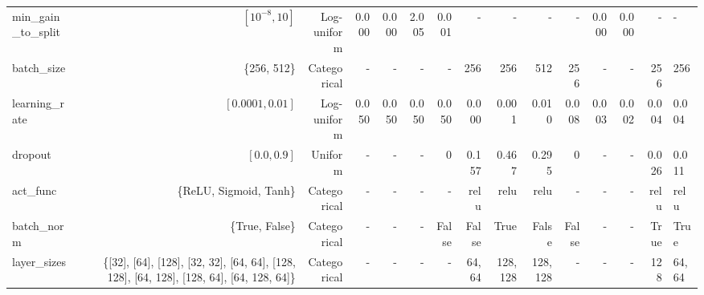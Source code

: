 \begin{tabular}{lrrrrrrrrrrrrr}
min_gain_to_split & $[10^{-8}, 10]$ & Log-uniform & 0.000 & 0.000 & 2.005 & 0.001 & - & - & - & - & 0.000 & 0.000 & - & - \\
batch_size & \{256, 512\} & Categorical & - & - & - & - & 256 & 256 & 512 & 256 & - & - & 256 & 256 \\
learning_rate & $[0.0001, 0.01]$ & Log-uniform & 0.050 & 0.050 & 0.050 & 0.050 & 0.000 & 0.001 & 0.010 & 0.008 & 0.003 & 0.002 & 0.004 & 0.004 \\
dropout & $[0.0, 0.9]$ & Uniform & - & - & - & 0 & 0.157 & 0.467 & 0.295 & 0 & - & - & 0.026 & 0.011 \\
act_func & \{ReLU, Sigmoid, Tanh\} & Categorical & - & - & - & - & relu & relu & relu & - & - & - & relu & relu \\
batch_norm & \{True, False\} & Categorical & - & - & - & False & False & True & False & False & - & - & True & True \\
layer_sizes & \{[32], [64], [128], [32, 32], [64, 64], [128, 128], [64, 128], [128, 64], [64, 128, 64]\} & Categorical & - & - & - & - & 64, 64 & 128, 128 & 128, 128 & - & - & - & 128 & 64, 64 \\
\bottomrule
\end{tabular}
